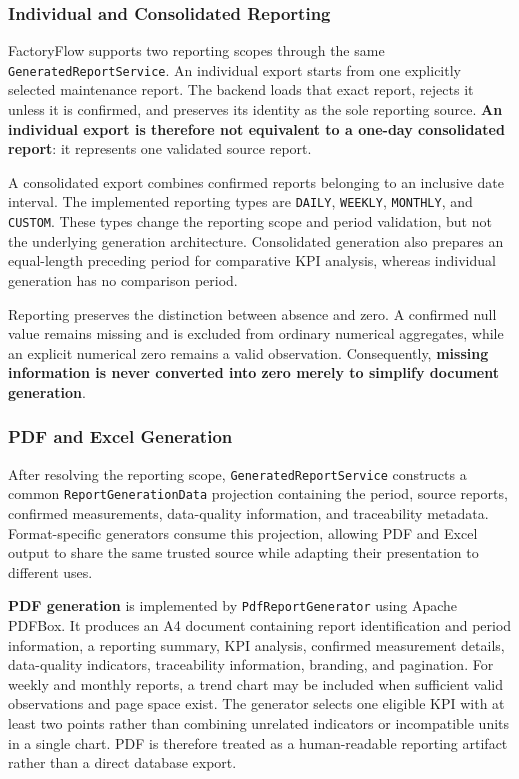 \subsubsection{Individual and Consolidated Reporting}

FactoryFlow supports two reporting scopes through the same \texttt{GeneratedReportService}. An individual export starts from one explicitly selected maintenance report. The backend loads that exact report, rejects it unless it is confirmed, and preserves its identity as the sole reporting source. \textbf{An individual export is therefore not equivalent to a one-day consolidated report}: it represents one validated source report.

A consolidated export combines confirmed reports belonging to an inclusive date interval. The implemented reporting types are \texttt{DAILY}, \texttt{WEEKLY}, \texttt{MONTHLY}, and \texttt{CUSTOM}. These types change the reporting scope and period validation, but not the underlying generation architecture. Consolidated generation also prepares an equal-length preceding period for comparative KPI analysis, whereas individual generation has no comparison period.

Reporting preserves the distinction between absence and zero. A confirmed null value remains missing and is excluded from ordinary numerical aggregates, while an explicit numerical zero remains a valid observation. Consequently, \textbf{missing information is never converted into zero merely to simplify document generation}.

\subsubsection{PDF and Excel Generation}

After resolving the reporting scope, \texttt{GeneratedReportService} constructs a common \texttt{ReportGenerationData} projection containing the period, source reports, confirmed measurements, data-quality information, and traceability metadata. Format-specific generators consume this projection, allowing PDF and Excel output to share the same trusted source while adapting their presentation to different uses.

\textbf{PDF generation} is implemented by \texttt{PdfReportGenerator} using Apache PDFBox. It produces an A4 document containing report identification and period information, a reporting summary, KPI analysis, confirmed measurement details, data-quality indicators, traceability information, branding, and pagination. For weekly and monthly reports, a trend chart may be included when sufficient valid observations and page space exist. The generator selects one eligible KPI with at least two points rather than combining unrelated indicators or incompatible units in a single chart. PDF is therefore treated as a human-readable reporting artifact rather than a direct database export.

